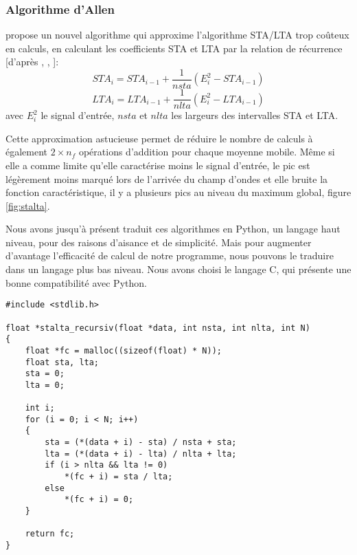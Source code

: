 \documentclass[a4paper, 11pt]{article} %
\begin{document}
\subsubsection{Algorithme d'Allen}

\cite{allen1982} propose un nouvel algorithme qui approxime l'algorithme STA/LTA trop coûteux en calculs, en calculant les coefficients STA et LTA par la relation de récurrence [d'après \cite{probatoire}, \cite{khalaf2016}, \cite{lumban2021}]:
\begin{equation}
   STA_i = STA_{i-1} + \frac{1}{nsta}(E_i^2 - STA_{i-1})
\end{equation}
\begin{equation}
   LTA_i = LTA_{i-1} + \frac{1}{nlta}(E_i^2 - LTA_{i-1})
\end{equation}
avec $E_i^2$ le signal d'entrée, $nsta$ et $nlta$ les largeurs des intervalles STA et LTA. 

Cette approximation astucieuse permet de réduire le nombre de calculs à également $2 \times n_f$ opérations d'addition pour chaque moyenne mobile. Même si elle a comme limite qu'elle caractérise moins le signal d'entrée, le pic est légèrement moins marqué lors de l'arrivée du champ d'ondes et elle bruite la fonction caractéristique, il y a plusieurs pics au niveau du maximum global, figure \ref{fig:stalta}.

Nous avons jusqu'à présent traduit ces algorithmes en Python, un langage haut niveau, pour des raisons d'aisance et de simplicité. Mais pour augmenter d'avantage l'efficacité de calcul de notre programme, nous pouvons le traduire dans un langage plus bas niveau. Nous avons choisi le langage C, qui présente une bonne compatibilité avec Python.

\begin{verbatim}
#include <stdlib.h>

float *stalta_recursiv(float *data, int nsta, int nlta, int N)
{
    float *fc = malloc((sizeof(float) * N));
    float sta, lta;
    sta = 0;
    lta = 0;
    
    int i;
    for (i = 0; i < N; i++)
    {
        sta = (*(data + i) - sta) / nsta + sta;
        lta = (*(data + i) - lta) / nlta + lta;
        if (i > nlta && lta != 0)
            *(fc + i) = sta / lta;
        else
            *(fc + i) = 0;
    }

    return fc;
}
\end{verbatim}
\end{document}
